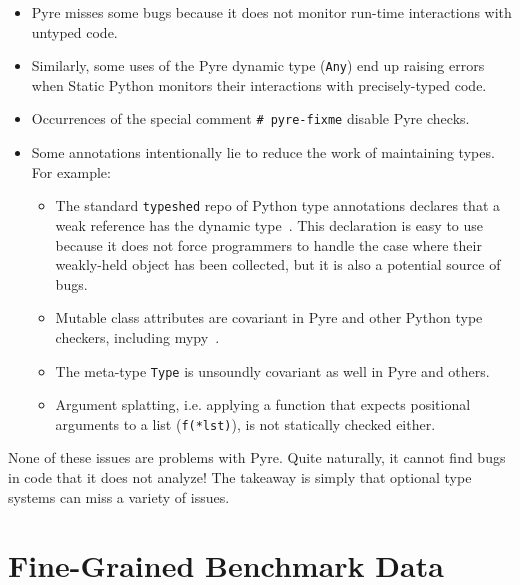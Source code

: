 \documentclass[english,cleveref,submission]{programming}
\newcommand{\SP}{Static Python}
\newcommand{\code}[1]{\texttt{#1}}
\begin{document}
\begin{itemize}
  \item
    Pyre misses some bugs because it does not monitor run-time interactions
    with untyped code.

  \item
    Similarly, some uses of the Pyre dynamic type (\code{Any}) end up
    raising errors when \SP{} monitors their interactions with precisely-typed code.

  \item
    Occurrences of the special comment \lstinline$# pyre-fixme$ disable Pyre checks.

  \item
    Some annotations intentionally lie to reduce the work of maintaining types.
    For example:

    \begin{itemize}
      \item
        The standard \code{typeshed} repo of Python type annotations declares
        that a weak reference has the dynamic type~\cite{typeshed}.
        This declaration is easy to use because it does not force programmers
        to handle the case where their weakly-held object has been collected,
        but it is also a potential source of bugs.
      \item
        Mutable class attributes are covariant in Pyre and other
        Python type checkers, including mypy~\cite{mypy}.
      \item
        The meta-type \code{Type} is unsoundly covariant as well in Pyre
        and others.
      \item
        Argument splatting, i.e. applying a function that expects positional
        arguments to a list (\code{f(*lst)}), is not statically checked
        either.
    \end{itemize}

\end{itemize}

None of these issues are problems with Pyre.
Quite naturally, it cannot find bugs in code that it does not analyze!
The takeaway is simply that optional type systems can miss a variety of issues.


\section{Fine-Grained Benchmark Data}

\newcommand{\colname}[1]{\textbf{#1}}
\end{document}
